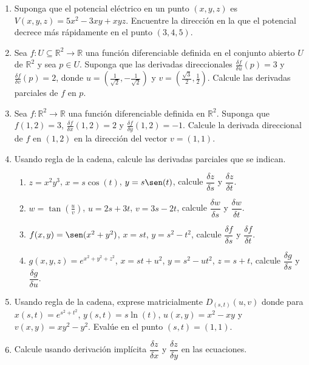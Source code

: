 \documentclass{article}
\begin{document}
\begin{enumerate}
\begin{enumerate}
    \end{enumerate}
  \vspace{2mm}
  \item Suponga que el potencial eléctrico en un punto $(x,y,z)$ es $V(x,y,z)=5x^2-3xy+xyz$. Encuentre la dirección en la que el potencial decrece más rápidamente en el punto $(3,4,5)$.
  \vspace{0.2cm}
  \item Sea $f:U\subseteq\mathbb{R}^2\to\mathbb{R}$ una función diferenciable definida en el conjunto abierto $U$ de $\mathbb{R}^2$ y sea $p\in U$. Suponga que las derivadas direccionales $\frac{\delta f}{\delta u}(p)=3$ y $\frac{\delta f}{\delta v}(p)=2$, donde $u=\left(\frac{1}{\sqrt{2}},-\frac{1}{\sqrt{2}}\right)$ y $v=\left(\frac{\sqrt{3}}{2},\frac{1}{2}\right)$. Calcule las derivadas parciales de $f$ en $p$.
  \vspace{2mm}
  \item Sea $f:\mathbb{R}^2\to\mathbb{R}$ una función diferenciable definida en $\mathbb{R}^2$. Suponga que $f(1,2)=3$, $\frac{\delta f}{\delta x}(1,2)=2$ y $\frac{\delta f}{\delta y}(1,2)=-1$. Calcule la derivada direccional de $f$ en $(1,2)$ en la dirección del vector $v=(1,1)$.
  \vspace{2mm}
  \item Usando regla de la cadena, calcule las derivadas parciales que se indican.
    \begin{enumerate}
      \item $z=x^2y^3$, $x=s\cos(t)$, $y=s\sen(t)$, calcule $\dfrac{\delta z}{\delta s}$ y $\dfrac{\delta z}{\delta t}$.
      \item $w=\tan\left(\frac{u}{v}\right)$, $u=2s+3t$, $v=3s-2t$, calcule $\dfrac{\delta w}{\delta s}$ y $\dfrac{\delta w}{\delta t}$.
      \item $f(x,y)=\sen(x^2+y^2)$, $x=st$, $y=s^2-t^2$, calcule $\dfrac{\delta f}{\delta s}$ y $\dfrac{\delta f}{\delta t}$.
      \item $g(x,y,z)=e^{x^2+y^2+z^2}$, $x=st+u^2$, $y=s^2-ut^2$, $z=s+t$, calcule $\dfrac{\delta g}{\delta s}$ y $\dfrac{\delta g}{\delta u}$.
    \end{enumerate}
  \vspace{2mm}
  \item Usando regla de la cadena, exprese matricialmente $D_{(s,t)}(u,v)$ donde para $x(s,t)= e^{s^2+t^2}$, $y(s,t)=s\ln(t) $, $u(x,y)=x^2-xy$ y $v(x,y)=xy^2-y^2$. Evalúe en el punto $(s,t)=(1,1)$.
  \item Calcule usando derivación implícita $\dfrac{\delta z}{\delta x}$ y $\dfrac{\delta z}{\delta y}$ en las ecuaciones.

\end{enumerate}
\end{document}
